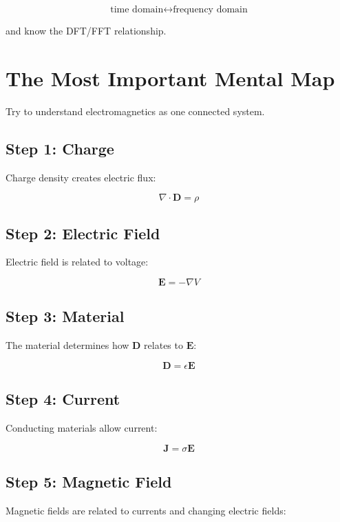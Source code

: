 \documentclass[11pt]{article}
\newcommand{\vect}[1]{\mathbf{#1}}
\begin{document}
\[
\boxed{
\text{time domain}
\longleftrightarrow
\text{frequency domain}
}
\]

and know the DFT/FFT relationship.



\section{The Most Important Mental Map}

Try to understand electromagnetics as one connected system.

\subsection*{Step 1: Charge}

Charge density creates electric flux:

\[
\boxed{
\nabla\cdot\vect{D}
=
\rho
}
\]

\subsection*{Step 2: Electric Field}

Electric field is related to voltage:

\[
\boxed{
\vect{E}
=
-\nabla V
}
\]

\subsection*{Step 3: Material}

The material determines how $\vect{D}$ relates to $\vect{E}$:

\[
\boxed{
\vect{D}
=
\epsilon\vect{E}
}
\]

\subsection*{Step 4: Current}

Conducting materials allow current:

\[
\boxed{
\vect{J}
=
\sigma\vect{E}
}
\]

\subsection*{Step 5: Magnetic Field}

Magnetic fields are related to currents and changing electric fields:
\end{document}
